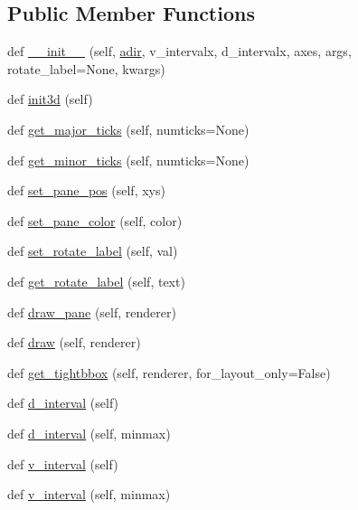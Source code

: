\subsection*{Public Member Functions}
\begin{DoxyCompactItemize}
\item 
def \hyperlink{classmplot3d_1_1axis3d_1_1Axis_a85ededf2f2848bf07f9f13fffc21d11b}{\+\_\+\+\_\+init\+\_\+\+\_\+} (self, \hyperlink{classmplot3d_1_1axis3d_1_1Axis_aae6bffe311acc83fe49d3b49300ffc01}{adir}, v\+\_\+intervalx, d\+\_\+intervalx, axes, args, rotate\+\_\+label=None, kwargs)
\item 
def \hyperlink{classmplot3d_1_1axis3d_1_1Axis_a8ebd435326aa97ccff7a284fe186dd62}{init3d} (self)
\item 
def \hyperlink{classmplot3d_1_1axis3d_1_1Axis_a51a1f0217b8da5c44ac71fdc23f0dbe6}{get\+\_\+major\+\_\+ticks} (self, numticks=None)
\item 
def \hyperlink{classmplot3d_1_1axis3d_1_1Axis_a4fbf9277bbf80a5f130f8e053abbed0a}{get\+\_\+minor\+\_\+ticks} (self, numticks=None)
\item 
def \hyperlink{classmplot3d_1_1axis3d_1_1Axis_a09b740f6f0ebb113b613ce1383cb582c}{set\+\_\+pane\+\_\+pos} (self, xys)
\item 
def \hyperlink{classmplot3d_1_1axis3d_1_1Axis_ac1b3879aa6cf0bd334fe94f034e4a046}{set\+\_\+pane\+\_\+color} (self, color)
\item 
def \hyperlink{classmplot3d_1_1axis3d_1_1Axis_ab492a2055ba6ad4a0221febd4abdf3fd}{set\+\_\+rotate\+\_\+label} (self, val)
\item 
def \hyperlink{classmplot3d_1_1axis3d_1_1Axis_ab15a8190ab81c23ec92b96b88eee07ec}{get\+\_\+rotate\+\_\+label} (self, text)
\item 
def \hyperlink{classmplot3d_1_1axis3d_1_1Axis_a47711c93718f158127aacb0669f4aa27}{draw\+\_\+pane} (self, renderer)
\item 
def \hyperlink{classmplot3d_1_1axis3d_1_1Axis_a4303fa83e39b85bf259e1f9e947f5d1e}{draw} (self, renderer)
\item 
def \hyperlink{classmplot3d_1_1axis3d_1_1Axis_a4046db6c59f15a404b92108590857ef6}{get\+\_\+tightbbox} (self, renderer, for\+\_\+layout\+\_\+only=False)
\item 
def \hyperlink{classmplot3d_1_1axis3d_1_1Axis_a7814c026d05596de501a7b45c32098f3}{d\+\_\+interval} (self)
\item 
def \hyperlink{classmplot3d_1_1axis3d_1_1Axis_a444bacc4b7642187ad0471aa8bc86d76}{d\+\_\+interval} (self, minmax)
\item 
def \hyperlink{classmplot3d_1_1axis3d_1_1Axis_a7b8176c8a55f7d051f1c7d0404a5a2c4}{v\+\_\+interval} (self)
\item 
def \hyperlink{classmplot3d_1_1axis3d_1_1Axis_a60147aa1f6730d5b25c5589f53c553a5}{v\+\_\+interval} (self, minmax)
\end{DoxyCompactItemize}
